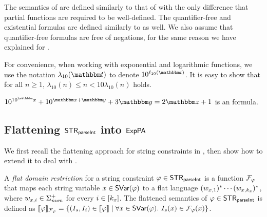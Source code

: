 The semantics of {\paexp} are defined similarly to that of {\pa} with the only difference that partial functions are required to be well-defined. The quantifier-free and existential {\paexp} formulas are defined similarly to {\pa} as well.
We also assume that quantifier-free {\paexp} formulas are free of negations, for the same reason we have explained for {\pa}.


For convenience, when working with exponential and logarithmic functions, we use the notation $\lambda_{10}(\iterm)$ to denote $10^{\ell_{10}(\iterm)}$. It is easy to show that for all $n \ge 1$, $\lambda_{10}(n) \le n < 10\lambda_{10}(n)$ holds.

\begin{example}
$10^{10^\ivarx}+10^{\ivarx+ \ivary} + 3\ivary    = 2 \ivarz +1 $ is an {\paexp} formula.
\end{example} 
 
\subsection{Flattening ${\sf STR}_{\textsf{parseInt}}$ into ${\sf ExpPA}$}

We first recall the flattening approach for string constraints in \cite{Parosh:20:PLDI}, then show how to extend it to deal with {\parseInt}.

A \emph{flat domain restriction} for a string constraint $\varphi\in {\sf STR}_{\textsf{parseInt}}$ is a function $\mathcal{F}_\varphi$ that maps each string variable $x \in \textsf{SVar}(\varphi)$ to a flat language $(w_{x,1})^* \cdots (w_{x, k_x})^*$, where $w_{x, i} \in \Sigma_{\textit{num}}^+$ for every $i \in [k_x]$. 
The flattened semantics of $\varphi \in {\sf STR}_{\textsf{parseInt}}$ is defined as $\llbracket \varphi \rrbracket_{\mathcal{F}_\varphi} = \{(I_s, I_i) \in \llbracket \varphi  \rrbracket \mid \forall x \in \textsf{SVar}(\varphi).\ I_s(x) \in  \mathcal{F}_\varphi(x)\}$.  

